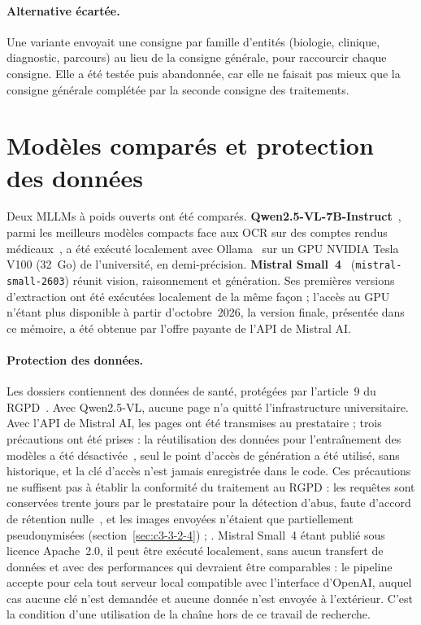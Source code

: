 \paragraph{Alternative écartée.} Une variante envoyait une consigne par famille d'entités (biologie, clinique, diagnostic, parcours) au lieu de la consigne générale, pour raccourcir chaque consigne. Elle a été testée puis abandonnée, car elle ne faisait pas mieux que la consigne générale complétée par la seconde consigne des traitements.

\section{Modèles comparés et protection des données}\label{sec:c4-modeles}

Deux MLLMs à poids ouverts ont été comparés. \textbf{Qwen2.5-VL-7B-Instruct}~\cite{bai2025qwen25vl}, parmi les meilleurs modèles compacts face aux OCR sur des comptes rendus médicaux~\cite{neveditsin2026compact}, a été exécuté localement avec Ollama~\cite{ollama} sur un GPU NVIDIA Tesla V100 (32~Go) de l'université, en demi-précision. \textbf{Mistral Small~4}~\cite{mistralsmall4} (\texttt{mistral-small-2603}) réunit vision, raisonnement et génération. Ses premières versions d'extraction ont été exécutées localement de la même façon ; l'accès au GPU n'étant plus disponible à partir d'octobre~2026, la version finale, présentée dans ce mémoire, a été obtenue par l'offre payante de l'API de Mistral AI.

\paragraph{Protection des données.}\label{sec:c4-donnees} Les dossiers contiennent des données de santé, protégées par l'article~9 du RGPD~\cite{rgpd2016}. Avec Qwen2.5-VL, aucune page n'a quitté l'infrastructure universitaire. Avec l'API de Mistral AI, les pages ont été transmises au prestataire ; trois précautions ont été prises : la réutilisation des données pour l'entraînement des modèles a été désactivée~\cite{mistral_retention}, seul le point d'accès de génération a été utilisé, sans historique, et la clé d'accès n'est jamais enregistrée dans le code. Ces précautions ne suffisent pas à établir la conformité du traitement au RGPD : les requêtes sont conservées trente jours par le prestataire pour la détection d'abus, faute d'accord de rétention nulle~\cite{mistral_retention,mistral_zdr}, et les images envoyées n'étaient que partiellement pseudonymisées (section~\ref{sec:c3-3-2-4}) ; . Mistral Small~4 étant publié sous licence Apache~2.0, il peut être exécuté localement, sans aucun transfert de données et avec des performances qui devraient être comparables : le pipeline accepte pour cela tout serveur local compatible avec l'interface d'OpenAI, auquel cas aucune clé n'est demandée et aucune donnée n'est envoyée à l'extérieur. C'est la condition d'une utilisation de la chaîne hors de ce travail de recherche.

